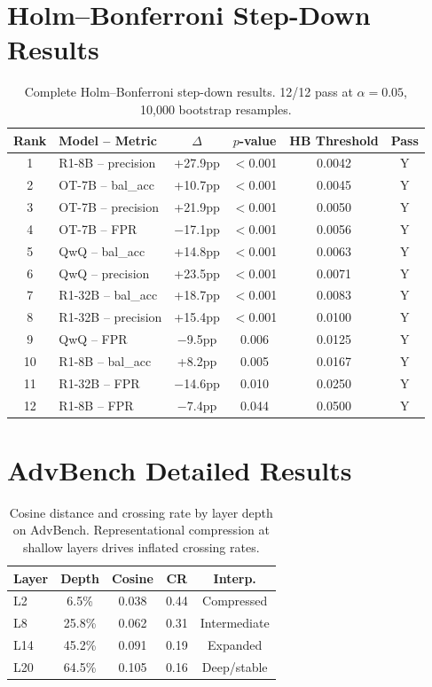 \documentclass[11pt]{article}
\begin{document}


\appendix

\section{Holm--Bonferroni Step-Down Results}
\label{app:hb}

\begin{table}[t]
\centering
\small
\begin{tabular}{@{}clcccc@{}}
\toprule
\textbf{Rank} & \textbf{Model -- Metric} & \textbf{$\Delta$} & \textbf{$p$-value} & \textbf{HB Threshold} & \textbf{Pass} \\
\midrule
1 & R1-8B -- precision & +27.9pp & $<$0.001 & 0.0042 & Y \\
2 & OT-7B -- bal\_acc & +10.7pp & $<$0.001 & 0.0045 & Y \\
3 & OT-7B -- precision & +21.9pp & $<$0.001 & 0.0050 & Y \\
4 & OT-7B -- FPR & $-$17.1pp & $<$0.001 & 0.0056 & Y \\
5 & QwQ -- bal\_acc & +14.8pp & $<$0.001 & 0.0063 & Y \\
6 & QwQ -- precision & +23.5pp & $<$0.001 & 0.0071 & Y \\
7 & R1-32B -- bal\_acc & +18.7pp & $<$0.001 & 0.0083 & Y \\
8 & R1-32B -- precision & +15.4pp & $<$0.001 & 0.0100 & Y \\
9 & QwQ -- FPR & $-$9.5pp & 0.006 & 0.0125 & Y \\
10 & R1-8B -- bal\_acc & +8.2pp & 0.005 & 0.0167 & Y \\
11 & R1-32B -- FPR & $-$14.6pp & 0.010 & 0.0250 & Y \\
12 & R1-8B -- FPR & $-$7.4pp & 0.044 & 0.0500 & Y \\
\bottomrule
\end{tabular}
\caption{Complete Holm--Bonferroni step-down results. 12/12 pass at $\alpha{=}0.05$, 10{,}000 bootstrap resamples.}
\label{tab:hb-full}
\end{table}


\section{AdvBench Detailed Results}
\label{app:advbench}

\begin{table}[t]
\centering
\small
\begin{tabular}{@{}lcccc@{}}
\toprule
\textbf{Layer} & \textbf{Depth} & \textbf{Cosine} & \textbf{CR} & \textbf{Interp.} \\
\midrule
L2 & 6.5\% & 0.038 & 0.44 & Compressed \\
L8 & 25.8\% & 0.062 & 0.31 & Intermediate \\
L14 & 45.2\% & 0.091 & 0.19 & Expanded \\
L20 & 64.5\% & 0.105 & 0.16 & Deep/stable \\
\bottomrule
\end{tabular}
\caption{Cosine distance and crossing rate by layer depth on AdvBench. Representational compression at shallow layers drives inflated crossing rates.}
\label{tab:advbench-cosine}
\end{table}
\end{document}
